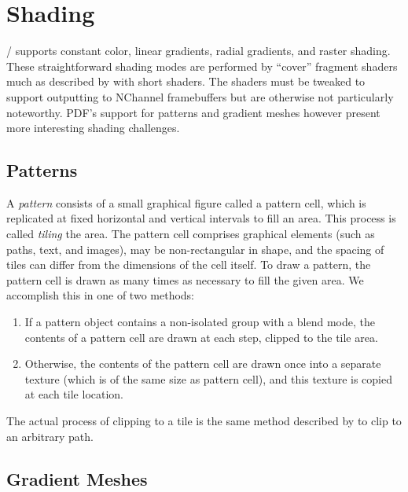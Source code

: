 
\section{Shading}
\label{sec:shading}

\Illustrator/ supports constant color, linear gradients, radial gradients, and raster shading.
These straightforward shading modes are performed by ``cover'' fragment shaders
much as described by \cite{KilgardBolz2012} with short shaders.  The shaders must be tweaked
to support outputting to NChannel framebuffers but are otherwise not particularly noteworthy.
PDF's support for patterns and gradient meshes however present more interesting shading challenges.

\subsection{Patterns}
\label{sec:patterns}

A {\em pattern} consists of a small graphical figure called a pattern cell,
which is replicated at fixed horizontal and vertical intervals to
fill an area.  This process is called {\em tiling} the area.  The pattern cell
comprises graphical elements (such as paths, text, and images), may
be non-rectangular in shape, and the spacing of tiles can differ from
the dimensions of the cell itself.  To draw a pattern, the pattern cell
is drawn as many times as necessary to fill the given area.  We accomplish
this in one of two methods:
\begin{enumerate}

\item If a pattern object contains a non-isolated group with a blend
mode, the contents of a pattern cell are drawn at each step, clipped to
the tile area.

\item Otherwise, the contents of the pattern cell are drawn once into a
separate texture (which is of the same size as pattern cell), and this
texture is copied at each tile location.

\end{enumerate}

The actual process of clipping to a tile is the same method described by \cite{KilgardBolz2012}
to clip to an arbitrary path.

\subsection{Gradient Meshes} 
\label{sec:gradient-meshes}

